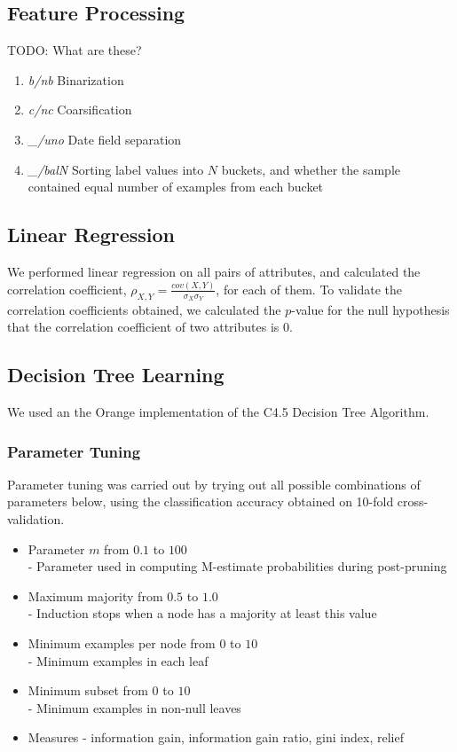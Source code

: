 \documentclass[]{article}
\begin{document}
\subsection{Feature Processing}

TODO: What are these?

\begin{enumerate}
	\item \emph{b/nb} Binarization
	\item \emph{c/nc} Coarsification
	\item \emph{\_/uno} Date field separation
	\item \emph{\_/balN} Sorting label values into $N$ buckets, and whether the sample contained equal number of examples from each bucket
\end{enumerate}

\subsection{Linear Regression}
We performed linear regression on all pairs of attributes, and calculated the correlation coefficient, $\rho_{X,Y} = \frac{cov(X,Y)}{\sigma_X\sigma_Y}$, for each of them. To validate the correlation coefficients obtained, we calculated the $p$-value for the null hypothesis that the correlation coefficient of two attributes is 0.

\subsection{Decision Tree Learning}

We used an the Orange implementation of the C4.5 Decision Tree Algorithm.

\subsubsection{Parameter Tuning}
Parameter tuning was carried out by trying out all possible combinations of parameters below, using the classification accuracy obtained on 10-fold cross-validation.

\begin{itemize}
	\item Parameter $m$ from $0.1$ to $100$ \\
		- Parameter used in computing M-estimate probabilities during post-pruning
	\item Maximum majority from $0.5$ to $1.0$ \\
		- Induction stops when a node has a majority at least this value
	\item Minimum examples per node from $0$ to $10$ \\
		- Minimum examples in each leaf
	\item Minimum subset from $0$ to $10$ \\
		- Minimum examples in non-null leaves
	\item Measures - information gain, information gain ratio, gini index, relief %
\end{itemize}
\end{document}
